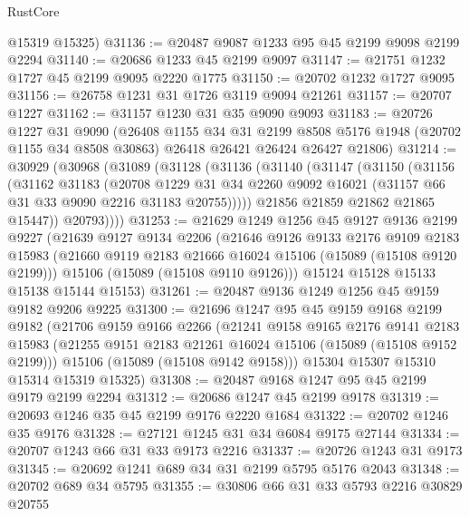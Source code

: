 \begin{lexlean}{RustCore}
\begin{coremodule}
      @15319
      @15325)
@31136 := @20487 @9087 @1233 @95 @45 @2199 @9098 @2199 @2294
@31140 := @20686 @1233 @45 @2199 @9097
@31147 := @21751 @1232 @1727 @45 @2199 @9095 @2220 @1775
@31150 := @20702 @1232 @1727 @9095
@31156 := @26758 @1231 @31 @1726 @3119 @9094 @21261
@31157 := @20707 @1227
@31162 := @31157 @1230 @31 @35 @9090 @9093
@31183 := @20726
    @1227
    @31
    @9090
    (@26408
      @1155
      @34
      @31
      @2199
      @8508
      @5176
      @1948
      (@20702 @1155 @34 @8508 @30863)
      @26418
      @26421
      @26424
      @26427
      @21806)
@31214 := @30929
    (@30968
      (@31089
        (@31128
          (@31136
            (@31140
              (@31147
                (@31150
                  (@31156
                    (@31162
                      @31183
                      (@20708
                        @1229
                        @31
                        @34
                        @2260
                        @9092
                        @16021
                        (@31157 @66 @31 @33 @9090 @2216 @31183 @20755)))))
                @21856
                @21859
                @21862
                @21865
                @15447))
            @20793))))
@31253 := @21629
    @1249
    @1256
    @45
    @9127
    @9136
    @2199
    @9227
    (@21639
      @9127
      @9134
      @2206
      (@21646
        @9126
        @9133
        @2176
        @9109
        @2183
        @15983
        (@21660 @9119 @2183 @21666 @16024 @15106 (@15089 (@15108 @9120 @2199)))
        @15106
        (@15089 (@15108 @9110 @9126)))
      @15124
      @15128
      @15133
      @15138
      @15144
      @15153)
@31261 := @20487 @9136 @1249 @1256 @45 @9159 @9182 @9206 @9225
@31300 := @21696
    @1247
    @95
    @45
    @9159
    @9168
    @2199
    @9182
    (@21706
      @9159
      @9166
      @2266
      (@21241
        @9158
        @9165
        @2176
        @9141
        @2183
        @15983
        (@21255 @9151 @2183 @21261 @16024 @15106 (@15089 (@15108 @9152 @2199)))
        @15106
        (@15089 (@15108 @9142 @9158)))
      @15304
      @15307
      @15310
      @15314
      @15319
      @15325)
@31308 := @20487 @9168 @1247 @95 @45 @2199 @9179 @2199 @2294
@31312 := @20686 @1247 @45 @2199 @9178
@31319 := @20693 @1246 @35 @45 @2199 @9176 @2220 @1684
@31322 := @20702 @1246 @35 @9176
@31328 := @27121 @1245 @31 @34 @6084 @9175 @27144
@31334 := @20707 @1243 @66 @31 @33 @9173 @2216
@31337 := @20726 @1243 @31 @9173
@31345 := @20692 @1241 @689 @34 @31 @2199 @5795 @5176 @2043
@31348 := @20702 @689 @34 @5795
@31355 := @30806 @66 @31 @33 @5793 @2216 @30829 @20755

\end{coremodule}
\end{lexlean}
